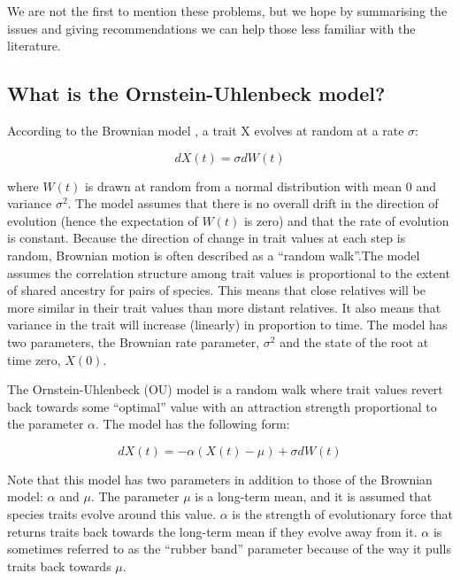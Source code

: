 \documentclass[a4paper,12pt]{article}
\begin{document}
We are not the first to mention these problems, but we hope by
summarising the issues and giving recommendations we can help those
less familiar with the literature.


  \subsection{What is the Ornstein-Uhlenbeck model?}
    According to the Brownian model \cite{cavalli1967,felsenstein1973maximum}, a trait X evolves at random at a rate $\sigma$:

    \begin{equation}
      dX(t) = \sigma dW(t)
      \label{equation:BMrate} 
    \end{equation}

    where $W(t)$ is drawn at random from a normal distribution with mean $0$ and variance $\sigma^2$. 
    The model assumes that there is no overall drift in the direction of evolution (hence the expectation of $W(t)$ is zero) and that the rate of evolution is constant. 
    Because the direction of change in trait values at each step is random, Brownian motion is often described as a ``random walk''.The model assumes the correlation structure among trait values is proportional to the extent of shared ancestry for pairs of species. 
    This means that close relatives will be more similar in their trait values than more distant relatives. It also means that variance in the trait will increase (linearly) in proportion to time. 
    The model has two parameters, the Brownian rate parameter, $\sigma^2$ and the state of the root at time zero, $X(0)$. 

    The Ornstein-Uhlenbeck (OU) model \citep{hansen1997stabilizing,Butler:2004aa} is a random walk where trait values revert back towards some ``optimal'' value with an attraction strength proportional to the parameter $\alpha$. 
    The model has the following form:
  
      \begin{equation}
        dX(t) = - \alpha (X(t) - \mu) + \sigma dW(t)
        \label{equation:OUrate} 
      \end{equation}

    Note that this model has two parameters in addition to those of the Brownian model: $\alpha$ and $\mu$. 
    The parameter $\mu$ is a long-term mean, and it is assumed that species traits evolve around this value. 
    $\alpha$ is the strength of evolutionary force that returns traits back towards the long-term mean if they evolve away from it.
     $\alpha$ is sometimes referred to as the ``rubber band'' parameter because of the way it pulls traits back towards $\mu$.
\end{document}
